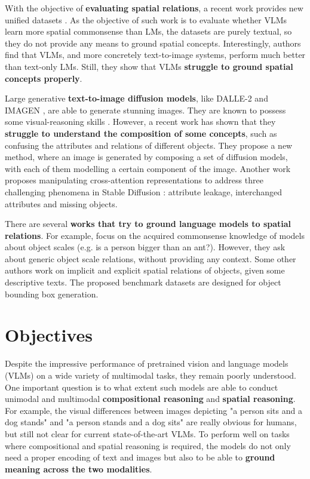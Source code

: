 With the objective of \textbf{evaluating spatial relations}, a recent work provides new unified datasets \cite{liu2022things}. As the objective of such work is to evaluate whether VLMs learn more spatial commonsense than LMs, the datasets are purely textual, so they do not provide any means to ground spatial concepts. Interestingly, authors find that VLMs, and more concretely text-to-image systems, perform much better than text-only LMs. Still, they show that VLMs \textbf{struggle to ground spatial concepts properly}.

Large generative \textbf{text-to-image diffusion models}, like DALLE-2 \cite{ramesh2022hierarchical} and IMAGEN \cite{saharia2022photorealistic}, are able to generate stunning images. They are known to possess some visual-reasoning skills \cite{cho2022dall}. However, a recent work \cite{liu2022compositional} has shown that they \textbf{struggle to understand the composition of some concepts}, such as confusing the attributes and relations of different objects. They propose a new method, where an image is generated by composing a set of diffusion models, with each of them modelling a certain component of the image. Another work \cite{anonymous2023trainingfree} proposes manipulating cross-attention representations to address three challenging phenomena in Stable Diffusion \cite{rombach2021highresolution}: attribute leakage, interchanged attributes and missing objects.

There are several \textbf{works that try to ground language models to spatial relations}. For example, \cite{bagherinezhad2016elephants, elazar2019large} focus on the acquired commonsense knowledge of models about object scales (e.g. is a person bigger than an ant?). However, they ask about generic object scale relations, without providing any context. Some other authors \cite{collell2018acquiring, elu2021inferring} work on implicit and explicit spatial relations of objects, given some descriptive texts. The proposed benchmark datasets are designed for object bounding box generation.

\section{Objectives} \label{sec:objectives}

Despite the impressive performance of pretrained vision and language models (VLMs) on a wide variety of multimodal tasks, they remain poorly understood. One important question is to what extent such models are able to conduct unimodal and multimodal \textbf{compositional reasoning} and \textbf{spatial reasoning}. For example, the visual differences between images depicting "a person sits and a dog stands" and "a person stands and a dog sits" are really obvious for humans, but still not clear for current state-of-the-art VLMs. To perform well on tasks where compositional and spatial reasoning is required, the models do not only need a proper encoding of text and images but also to be able to \textbf{ground meaning across the two modalities}.

